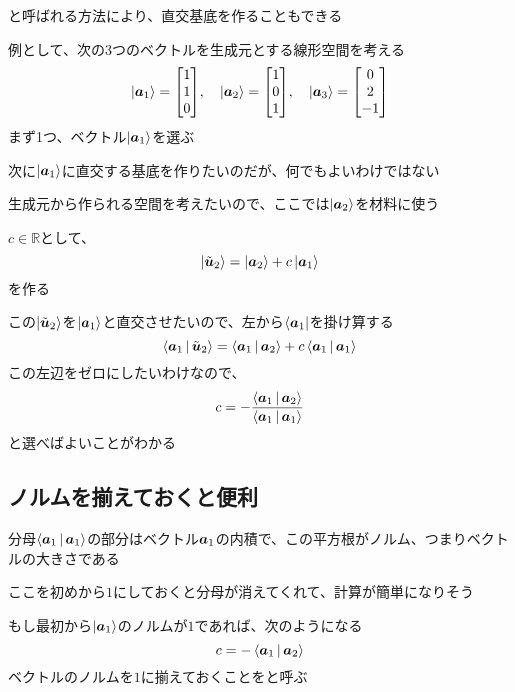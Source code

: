 \documentclass[../book_half_step_linear]{subfiles}
\begin{document}
と呼ばれる方法により、直交基底を作ることもできる

\br

例として、次の3つのベクトルを生成元とする線形空間を考える
\begin{equation*}
  \ket{\vb*{a}_1} = \mqty[1 \\ 1 \\ 0], \quad \ket{\vb*{a}_2} = \mqty[1 \\ 0 \\ 1], \quad \ket{\vb*{a}_3} = \mqty[0 \\ 2 \\ -1]
\end{equation*}
まず1つ、ベクトル$\ket{\vb*{a}_1}$を選ぶ

次に$\ket{\vb*{a}_1}$に直交する基底を作りたいのだが、何でもよいわけではない

生成元から作られる空間を考えたいので、ここでは$\ket{\vb*{a}_2}$を材料に使う

$c \in \mathbb{R} $として、
\begin{equation*}
  \Ket{\tilde{\vb*{u}}_2} = \Ket{\vb*{a}_2} + c \Ket{\vb*{a}_1}
\end{equation*}
を作る

この$\Ket{\tilde{\vb*{u}}_2}$を$\ket{\vb*{a}_1}$と直交させたいので、左から$\bra{\vb*{a}_1}$を掛け算する
\begin{equation*}
  \Braket{\vb*{a}_1|\tilde{\vb*{u}}_2} = \Braket{\vb*{a}_1|\vb*{a}_2} + c \Braket{\vb*{a}_1|\vb*{a}_1}
\end{equation*}
この左辺をゼロにしたいわけなので、
\begin{equation*}
  c = -\frac{\Braket{\vb*{a}_1|\vb*{a}_2}}{\Braket{\vb*{a}_1|\vb*{a}_1}}
\end{equation*}
と選べばよいことがわかる

\sectionline
\subsection{ノルムを揃えておくと便利}

分母$\Braket{\vb*{a}_1|\vb*{a}_1}$の部分はベクトル$\vb*{a}_1$の内積で、この平方根がノルム、つまりベクトルの大きさである

ここを初めから$1$にしておくと分母が消えてくれて、計算が簡単になりそう

もし最初から$\ket{\vb*{a}_1}$のノルムが$1$であれば、次のようになる
\begin{equation*}
  c = -\Braket{\vb*{a}_1|\vb*{a}_2}
\end{equation*}
ベクトルのノルムを$1$に揃えておくことをと呼ぶ
\end{document}
